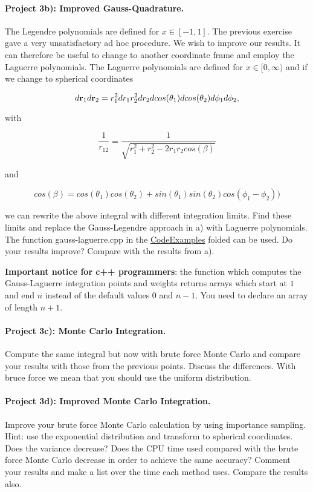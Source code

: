 \documentclass[%
oneside,                 %
final,                   %
10pt]{article}
\begin{document}
\paragraph{Project  3b): Improved Gauss-Quadrature.}
The Legendre polynomials are defined for $x\in [-1,1]$. The previous
exercise gave a very unsatisfactory ad hoc procedure. We wish to
improve our results. It can therefore be useful to change to another
coordinate frame and employ the Laguerre polynomials. The Laguerre
polynomials are defined for $x\in [0,\infty)$ and if we change to
spherical coordinates

\[
   d{\bf r}_1d{\bf r}_2  = r_1^2dr_1 r_2^2dr_2 dcos(\theta_1)dcos(\theta_2)d\phi_1d\phi_2,
\]

with

\[
   \frac{1}{r_{12}}= \frac{1}{\sqrt{r_1^2+r_2^2-2r_1r_2cos(\beta)}}
\]

and 

\[
cos(\beta) = cos(\theta_1)cos(\theta_2)+sin(\theta_1)sin(\theta_2)cos(\phi_1-\phi_2))
\]

we can rewrite the above integral with different integration
limits. Find these limits and replace the Gauss-Legendre approach in
a) with Laguerre polynomials.  The function gauss-laguerre.cpp in the \href{{https://github.com/CompPhysics/ComputationalPhysics/tree/master/doc/Projects/2019/Project3/CodeExamples}}{CodeExamples} folded can be
used.  Do your results
improve? Compare with the results from a).

\textbf{Important notice for c++ programmers}: the function which computes the Gauss-Laguerre integration points and weights returns arrays which start at $1$ and end $n$ instead of the default values $0$ and $n-1$. You need to declare an array of length $n+1$. 

\paragraph{Project  3c): Monte Carlo Integration.}
Compute the same integral but now with brute force Monte Carlo
and compare your results with those from the previous points. Discuss the differences.
With bruce force we mean that you should use the uniform distribution.

\paragraph{Project  3d): Improved Monte Carlo Integration.}
Improve your brute force Monte Carlo calculation by using importance sampling.
Hint: use the exponential distribution and transform to spherical coordinates.
Does the variance decrease? Does the CPU time used compared with the brute force 
Monte Carlo decrease in order to achieve the same accuracy? Comment your results
and make a list over the time each method uses. Compare the results also.
\end{document}
